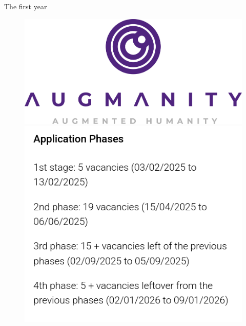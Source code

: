 \begin{frame}{The first year}
    \begin{figure}
        \begin{minipage}[t]{0.30\linewidth}
            \centering
            \vspace{0pt}
            \includegraphics[width=\textwidth]{img/student_grant.png}
        \end{minipage}
        \hspace{0.5cm}
        \begin{minipage}[t]{0.50\linewidth}
            \centering
            \vspace{0pt}
            \includegraphics[width=\textwidth]{img/application_phases.png}
        \end{minipage}
    \end{figure}
\end{frame}
